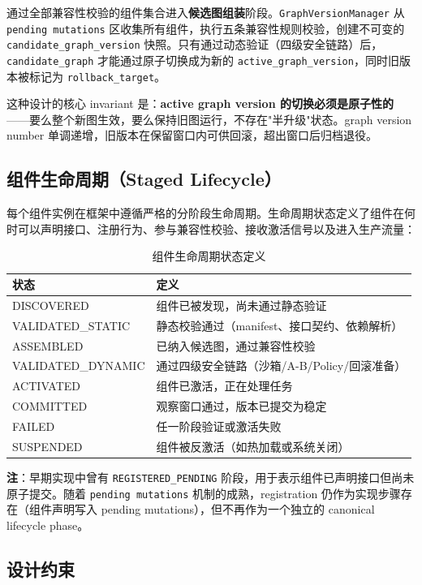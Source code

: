通过全部兼容性校验的组件集合进入\textbf{候选图组装}阶段。\texttt{GraphVersionManager} 从 \texttt{pending mutations} 区收集所有组件，执行五条兼容性规则校验，创建不可变的 \texttt{candidate\_graph\_version} 快照。只有通过动态验证（四级安全链路）后，\texttt{candidate\_graph} 才能通过原子切换成为新的 \texttt{active\_graph\_version}，同时旧版本被标记为 \texttt{rollback\_target}。

这种设计的核心 invariant 是：\textbf{active graph version 的切换必须是原子性的}——要么整个新图生效，要么保持旧图运行，不存在"半升级"状态。graph version number 单调递增，旧版本在保留窗口内可供回滚，超出窗口后归档退役。

\subsection{组件生命周期（Staged Lifecycle）}

每个组件实例在框架中遵循严格的分阶段生命周期。生命周期状态定义了组件在何时可以声明接口、注册行为、参与兼容性校验、接收激活信号以及进入生产流量：

\begin{table}[htbp]
\centering
\caption{组件生命周期状态定义}
\label{tab:lifecycle}
\begin{tabular}{@{}lp{9.5cm}@{}}
\toprule
\textbf{状态} & \textbf{定义} \\
\midrule
DISCOVERED & 组件已被发现，尚未通过静态验证 \\
VALIDATED\_STATIC & 静态校验通过（manifest、接口契约、依赖解析） \\
ASSEMBLED & 已纳入候选图，通过兼容性校验 \\
VALIDATED\_DYNAMIC & 通过四级安全链路（沙箱/A-B/Policy/回滚准备） \\
ACTIVATED & 组件已激活，正在处理任务 \\
COMMITTED & 观察窗口通过，版本已提交为稳定 \\
FAILED & 任一阶段验证或激活失败 \\
SUSPENDED & 组件被反激活（如热加载或系统关闭） \\
\bottomrule
\end{tabular}
\end{table}

\textbf{注}：早期实现中曾有 \texttt{REGISTERED\_PENDING} 阶段，用于表示组件已声明接口但尚未原子提交。随着 \texttt{pending mutations} 机制的成熟，registration 仍作为实现步骤存在（组件声明写入 pending mutations），但不再作为一个独立的 canonical lifecycle phase。

\subsection{设计约束}

